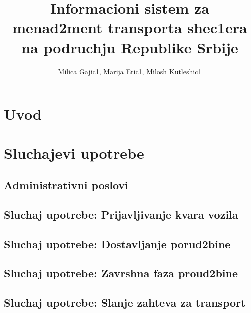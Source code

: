 \documentclass{article}
\title{Informacioni sistem za menad2ment transporta shec1era na podruchju Republike Srbije}
\author{Milica Gajic1, Marija Eric1, Milosh Kutleshic1}
\begin{document}
\maketitle
\newpage


\renewcommand*\contentsname{Sadrz1aj}
\tableofcontents
\newpage

\section{Uvod}

\section{Sluchajevi upotrebe}
\subsection{Administrativni poslovi}


\subsection{Sluchaj upotrebe: Prijavljivanje kvara vozila}

\subsection{Sluchaj upotrebe: Dostavljanje porud2bine}

\subsection{Sluchaj upotrebe: Zavrshna faza proud2bine}


\subsection{Sluchaj upotrebe: Slanje zahteva za transport}


\nocite{*}
\selectfont



\end{document}
